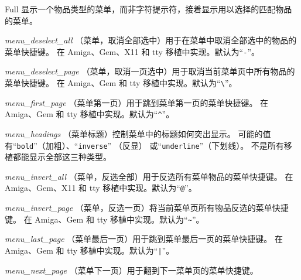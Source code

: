 \documentclass[a4paper, 10pt]{article}
\newcommand{\ib}[1]{\it #1 \hfill}
\begin{document}
Full 显示一个物品类型的菜单，而非字符提示符，接着显示用以选择的匹配物品的菜单。
\item[\ib{menu\_deselect\_all}]
（菜单，取消全部选中）用于在菜单中取消全部选中的物品的菜单快捷键。
在 Amiga、Gem、X11 和 tty 移植中实现。默认为“{\tt -}”。
\item[\ib{menu\_deselect\_page}]
（菜单，取消一页选中）用于取消当前菜单页中所有物品的菜单快捷键。
在 Amiga、Gem 和 tty 移植中实现。默认为“\verb+\+”。
\item[\ib{menu\_first\_page}]
（菜单第一页）用于跳到菜单第一页的菜单快捷键。
在 Amiga、Gem 和 tty 移植中实现。默认为“\verb+^+”。
\item[\ib{menu\_headings}]
（菜单标题）控制菜单中的标题如何突出显示。
可能的值有“{\tt bold}”（加粗）、“{\tt inverse}” （反显）
或“{\tt underline}”（下划线）。
不是所有移植都能显示全部这三种类型。
\item[\ib{menu\_invert\_all}]
（菜单，反选全部）用于反选所有菜单物品的菜单快捷键。
在 Amiga、Gem、X11 和 tty 移植中实现。默认为“{\tt @}”。
\item[\ib{menu\_invert\_page}]
（菜单，反选一页）将当前菜单页所有物品反选的菜单快捷键。
在 Amiga、Gem 和 tty 移植中实现。默认为“\verb+~+”。
\item[\ib{menu\_last\_page}]
（菜单最后一页）用于跳到菜单最后一页的菜单快捷键。
在 Amiga、Gem 和 tty 移植中实现。默认为“\verb+|+”。
\item[\ib{menu\_next\_page}]
（菜单下一页）用于翻到下一菜单页的菜单快捷键。
\end{document}
